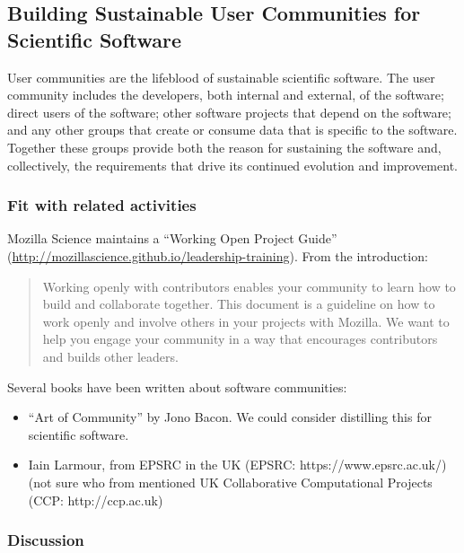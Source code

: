 \subsection{Building Sustainable User Communities for Scientific Software}


User communities are the lifeblood of sustainable scientific software. The user community includes the developers, 
both internal and external, of the software; direct users of the software; other software projects that depend on
the software; and any other groups that create or consume data that is specific to the software. Together these
groups provide both the reason for sustaining the software and, collectively, the requirements that drive its continued
evolution and improvement.

\subsubsection{Fit with related activities}

Mozilla Science maintains a ``Working Open Project Guide'' (\url{http://mozillascience.github.io/leadership-training}).  From the introduction:
\begin{quote}
Working openly with contributors enables your
    community to learn how to build and collaborate together. This
    document is a guideline on how to work openly and involve others
    in your projects with Mozilla. We want to help you engage your
    community in a way that encourages contributors and builds other
    leaders.
 \end{quote}

Several books have been written about software communities:
\begin{itemize}
\item ``Art of Community'' by Jono Bacon.  We could consider distilling this for scientific software.
\item Iain Larmour, from EPSRC in the UK (EPSRC: https://www.epsrc.ac.uk/) (not sure who from mentioned UK Collaborative Computational Projects (CCP: http://ccp.ac.uk)
\end{itemize}

\subsubsection{Discussion}

